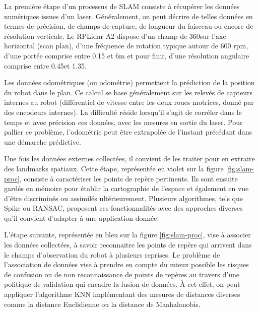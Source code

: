 La première étape d'un processus de SLAM consiste à récupérer les données numériques issues d'un laser. 
Généralement, on peut décrire de telles données en termes de précision, de champs de capture, de longueur du faisceau ou encore de résolution verticale. 
Le RPLidar A2 dispose d'un champ de 360\degre sur l'axe horizontal (scan plan), d'une fréquence de rotation typique autour de 600 rpm, d'une portée comprise entre 0.15 et 6m et pour finir, d'une résolution angulaire comprise entre 
0.45\degre et 1.35\degre.

Les données odométriques (ou odométrie) permettent la prédiction de la position du robot dans le plan. 
Ce calcul se base généralement sur les relevés de capteurs internes au robot (différentiel de vitesse entre les deux roues motrices, donné par des encodeurs internes). 
La difficulté réside lorsqu'il s'agit de corréler dans le temps et avec précision ces données, avec les mesures en sortie du laser.
Pour pallier ce problème, l'odométrie peut être extrapolée de l'instant précédant dans une démarche prédictive. 

Une fois les données externes collectées, il convient de les traiter pour en extraire des \gls{landmarks} spatiaux. 
Cette étape, représentée en violet sur la figure \ref{fig:slam-proc}, consiste à caractériser les points de repère pertinents. 
Ils sont ensuite gardés en mémoire pour établir la cartographie de l'espace et également en vue d'être discriminés ou assimilés ultérieurement.
Plusieurs algorithmes, tels que Spike ou RANSAC, proposent ces fonctionnalités avec des approches diverses qu'il convient d'adapter à une application donnée\cite{Bib_dummies}.

L'étape suivante, représentée en bleu sur la figure \ref{fig:slam-proc}, vise à associer les données collectées, à savoir reconnaitre les points de repère qui arrivent dans le champs d'observation du robot à plusieurs reprises. 
Le problème de l'association de données vise à prendre en compte du mieux possible les risques de confusion ou de non reconnaissance de points de repères au travers d'une politique de validation qui encadre la fusion de données. 
\`{A} cet effet, on peut appliquer l'algorithme \gls{KNN} implémentant des mesures de distances diverses comme la distance Euclidienne ou la distance de Maahalanobis.

